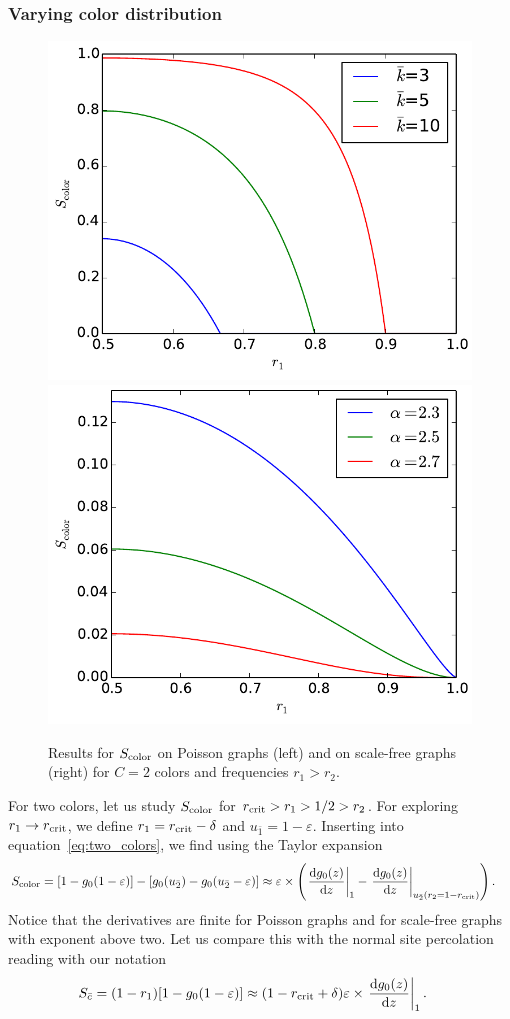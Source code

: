 \documentclass[aps, pre, onecolumn, a4paper, floatfix]{revtex4}
\begin{document}
\subsubsection{Varying color distribution}

\begin{figure}[htb]
    \includegraphics[width=0.45\columnwidth]{critical_poisson.pdf}
    \includegraphics[width=0.45\columnwidth]{critical_broad.pdf}\\
    \caption{Results for $S_{\rm color}$ on Poisson graphs (left) and 
    on scale-free graphs (right) for $C=2$ colors and frequencies $r_1>r_2$.}
    \label{fig:decomposition}
\end{figure}
%
For two colors, let us study $S_{\rm color}$ for $r_{\rm crit}>r_1>1/2>r_2$. 
For exploring $r_1\to r_{\rm crit}$, 
we define $r_1=r_{\rm crit}-\delta$ and $u_{\bar 1}=1-\varepsilon$. 
Inserting into equation~\ref{eq:two_colors}, we find using the Taylor expansion
\begin{align}
S_{\rm color} &= [1 - g_0(1-\varepsilon)] - [g_0(u_{\bar 2})-g_0(u_{\bar 2}-\varepsilon)]
 \approx \varepsilon \times \left(\left.\frac{{\rm d}g_0(z)}{{\rm d}z}\right|_{1} - 
 \left.\frac{{\rm d}g_0(z)}{{\rm d}z}\right|_{u_{\bar 2}(r_2=1-r_{\rm crit})}\right).
\end{align}
Notice that the derivatives are finite for Poisson graphs 
and for scale-free graphs with exponent above two. 
Let us compare this with the normal site percolation reading with our notation 
\begin{align}
S_{\bar c} &= (1-r_1)[1 - g_0(1-\varepsilon)] 
 \approx (1-r_{\rm crit}+\delta) \varepsilon \times \left.\frac{{\rm d}g_0(z)}{{\rm d}z}\right|_{1}.
\end{align}
\end{document}
